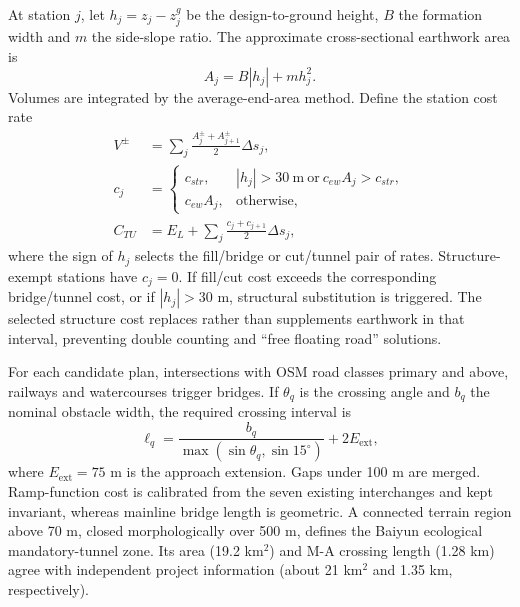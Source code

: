 \documentclass[preprint,12pt]{elsarticle}
\begin{document}
At station $j$, let $h_j=z_j-z^g_j$ be the design-to-ground height, $B$ the formation width and $m$ the side-slope ratio. The approximate cross-sectional earthwork area is
\begin{equation}
A_j=B|h_j|+m h_j^2.
\end{equation}
Volumes are integrated by the average-end-area method. Define the station cost rate
\begin{align}
V^{\pm}&=\sum_j\frac{A_j^{\pm}+A_{j+1}^{\pm}}{2}\Delta s_j,\\
c_j&=\begin{cases}
c_{str},& |h_j|>30\ \mathrm{m}\ \text{or}\ c_{ew}A_j>c_{str},\\
c_{ew}A_j,&\text{otherwise},
\end{cases}\\
C_{TU}&=E_L+\sum_j\frac{c_j+c_{j+1}}{2}\Delta s_j,
\label{eq:earthwork}
\end{align}
where the sign of $h_j$ selects the fill/bridge or cut/tunnel pair of rates. Structure-exempt stations have $c_j=0$. If fill/cut cost exceeds the corresponding bridge/tunnel cost, or if $|h_j|>30$ m, structural substitution is triggered. The selected structure cost replaces rather than supplements earthwork in that interval, preventing double counting and ``free floating road'' solutions.

For each candidate plan, intersections with OSM road classes primary and above, railways and watercourses trigger bridges. If $\theta_q$ is the crossing angle and $b_q$ the nominal obstacle width, the required crossing interval is
\begin{equation}
\ell_q=\frac{b_q}{\max(\sin\theta_q,\sin15^\circ)}+2E_{\mathrm{ext}},
\end{equation}
where $E_{\mathrm{ext}}=75$ m is the approach extension. Gaps under 100 m are merged. Ramp-function cost is calibrated from the seven existing interchanges and kept invariant, whereas mainline bridge length is geometric. A connected terrain region above 70 m, closed morphologically over 500 m, defines the Baiyun ecological mandatory-tunnel zone. Its area (19.2 km$^2$) and M-A crossing length (1.28 km) agree with independent project information (about 21 km$^2$ and 1.35 km, respectively).
\end{document}
